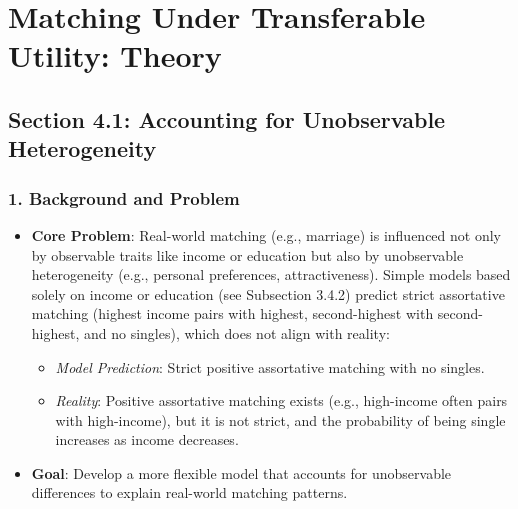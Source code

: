 \chapter{Matching Under Transferable Utility: Theory}

\section*{Section 4.1: Accounting for Unobservable Heterogeneity}

\subsection*{1. Background and Problem}
\begin{itemize}
    \item \textbf{Core Problem}: Real-world matching (e.g., marriage) is influenced not only by observable traits like income or education but also by unobservable heterogeneity (e.g., personal preferences, attractiveness). Simple models based solely on income or education (see Subsection 3.4.2) predict strict assortative matching (highest income pairs with highest, second-highest with second-highest, and no singles), which does not align with reality:
    \begin{itemize}
        \item \textit{Model Prediction}: Strict positive assortative matching with no singles.
        \item \textit{Reality}: Positive assortative matching exists (e.g., high-income often pairs with high-income), but it is not strict, and the probability of being single increases as income decreases.
    \end{itemize}
    \item \textbf{Goal}: Develop a more flexible model that accounts for unobservable differences to explain real-world matching patterns.
\end{itemize}

